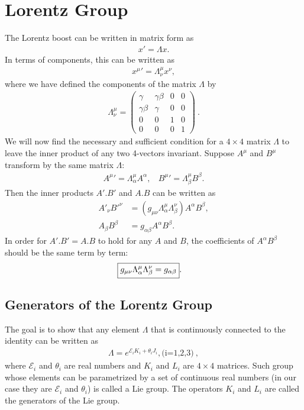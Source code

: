 \documentclass[12pt,a4paper]{report}
\begin{document}
\section{Lorentz Group}
The Lorentz boost can be written in matrix form as \cite{Hitoshi, Ryder}
\begin{align}
    x'=\Lambda x.
\end{align}
In terms of components, this can be written as
\begin{align}
    x^\mu'=\Lambda^\mu_\nu x^\nu,
\end{align}
where we have defined the components of the matrix $\Lambda$ by
\begin{align}
    \Lambda^\mu_\nu=\begin{pmatrix}
    \gamma&\gamma\beta&0&0\\
    \gamma\beta&\gamma&0&0\\
    0&0&1&0\\
    0&0&0&1
\end{pmatrix}~.
\end{align}
We will now find the necessary and sufficient condition for a $4 \times 4$ matrix $\Lambda$ to leave the inner product of any two 4-vectors invariant. Suppose $A^\mu$ and $B^\mu$ transform by the same matrix $\Lambda$:
\begin{align}
    A^\mu'=\Lambda^\mu_\alpha A^\alpha,~~~~B^\mu'=\Lambda^\mu_\beta B^\beta.
\end{align}
Then the inner products $A'.B'$ and $A.B$ can be written as
\begin{align}
    A'_\nu B'^\nu&=(g_{\mu\nu}\Lambda^\mu_\alpha\Lambda^\nu_\beta)A^\alpha B^\beta,\\
    A_\beta B^\beta&=g_{\alpha\beta}A^\alpha B^\beta.
\end{align}
In order for $A'.B'=A.B$ to hold for any $A$ and $B$, the coefficients of $A^\alpha B^\beta$ should be the same term by term:
\begin{align}
    \Aboxed{g_{\mu\nu}\Lambda^\mu_\alpha\Lambda^\nu_\beta=g_{\alpha\beta}}\label{1.31}.
\end{align}
\subsection{Generators of the Lorentz Group}
The goal is to show that any element $\Lambda$ that is continuously connected to the identity can be written as \cite{Hitoshi, Ryder}
\begin{align}
    \Lambda=e^{\mathcal{E}_iK_i+\theta_iJ_i}, \text{(i=1,2,3)}~,
\end{align}
where $\mathcal{E}_i$ and $\theta_i$ are real numbers and $K_i$ and $L_i$ are $4\times4$ matrices. Such group whose elements can be parametrized by a set of continuous real numbers (in our case they are $\mathcal{E}_i$ and $\theta_i$) is called a Lie group. The operators $K_i$ and $L_i$ are called the generators of the Lie group.
\end{document}
